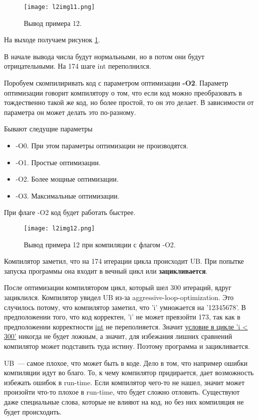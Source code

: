 \begin{figure}[h]
    \centering
    \texttt{[image: l2img11.png]}
    \caption{Вывод примера 12.}
    \label{l2img11}
\end{figure}

На выходе получаем рисунок \ref{l2img11}.

В начале вывода числа будут нормальными, но в потом они будут отрицательными.
На 174 шаге int переполнился.

Поробуем скомпилиривать код с параметром оптимизации \textbf{-O2}.
Параметр оптимизации говорит компилятору о том, что если код можно преобразовать в тождественно такой же код, 
но более простой, то он это делает. В зависимости от параметра он может делать это по-разному.

Бывают следущие параметры
\begin{itemize}
    \item -O0. При этом параметры оптимизации не производятся.
    \item -O1. Простые оптимизации.
    \item -O2. Более мощные оптимизации.
    \item -O3. Максимальные оптимизации.
\end{itemize}

При флаге -O2 код будет работать быстрее.

\begin{figure}[h]
    \centering
    \texttt{[image: l2img12.png]}
    \caption{Вывод примера 12 при компиляции с флагом -O2.}
    \label{l2img12}
\end{figure}

Компилятор заметил, что на 174 итерации цикла происходит UB.
При попытке запуска программы она входит в вечный цикл или \textbf{зацикливается}.

После оптимизации компилятором цикл, который шел 300 итераций, вдруг зациклился.
Компилятор увидел UB из-за aggressive-loop-optimization. Это случилось потому, что компилятор заметил, что 'i' 
умножается на '12345678'. В предположении того, что код корректен, 'i' не может превзойти 173, так как в предположении корректности \underline{int} не переполняется.
Значит \underline{условие в цикле 'i < 300'} никогда не будет ложным, а значит, для избежания лишних сравнений компилятор может подставить туда истину.
Поэтому программа и зацикливается.

UB~--- самое плохое, что может быть в коде. Дело в том, что например ошибки компиляции идут во благо. То, к чему компилятор придирается, дает возможность избежать ошибок в run-time.
Если компилятор чего-то не нашел, значит может произойти что-то плохое в run-time, что будет сложно отловить. Существуют даже специальные слова, которые не влияют на код,
но без них компиляция не будет происходить.

